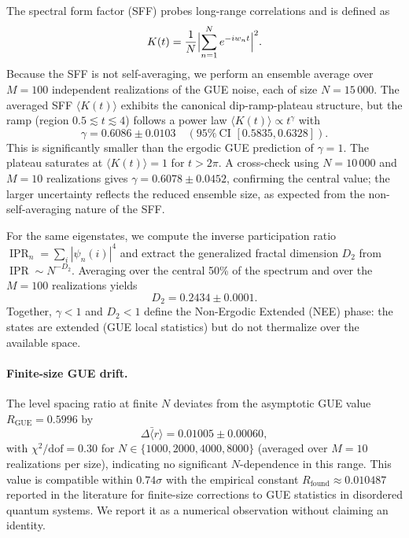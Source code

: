 \documentclass[11pt,a4paper]{article}
\DeclareMathOperator{\IPR}{IPR}
\begin{document}
The spectral form factor (SFF) probes long-range correlations and is defined as
\begin{equation}
K(t) = \frac{1}{N}\Bigl|\sum_{n=1}^N e^{-i w_n t}\Bigr|^2.
\end{equation}
Because the SFF is not self-averaging, we perform an ensemble average over $M=100$ independent realizations of the GUE noise, each of size $N=15\,000$. The averaged SFF $\langle K(t)\rangle$ exhibits the canonical dip-ramp-plateau structure, but the ramp (region $0.5 \lesssim t \lesssim 4$) follows a power law $\langle K(t)\rangle \propto t^\gamma$ with
\begin{equation}
\gamma = 0.6086 \pm 0.0103 \quad (95\%\ \text{CI } [0.5835,0.6328]).
\end{equation}
This is significantly smaller than the ergodic GUE prediction of $\gamma=1$. The plateau saturates at $\langle K(t)\rangle =1$ for $t>2\pi$. A cross-check using $N=10\,000$ and $M=10$ realizations gives $\gamma = 0.6078 \pm 0.0452$, confirming the central value; the larger uncertainty reflects the reduced ensemble size, as expected from the non-self-averaging nature of the SFF.

For the same eigenstates, we compute the inverse participation ratio $\IPR_n = \sum_i |\psi_n(i)|^4$ and extract the generalized fractal dimension $D_2$ from $\IPR \sim N^{-D_2}$. Averaging over the central 50\% of the spectrum and over the $M=100$ realizations yields
\begin{equation}
D_2 = 0.2434 \pm 0.0001.
\end{equation}
Together, $\gamma<1$ and $D_2<1$ define the Non-Ergodic Extended (NEE) phase: the states are extended (GUE local statistics) but do not thermalize over the available space.

\paragraph{Finite-size GUE drift.}
The level spacing ratio at finite $N$ deviates from the asymptotic GUE
value $R_{\text{GUE}} = 0.5996$ by
\begin{equation}
\bar{\Delta\langle r \rangle} = 0.01005 \pm 0.00060,
\end{equation}
with $\chi^2/\text{dof} = 0.30$ for $N \in \{1000, 2000, 4000, 8000\}$
(averaged over $M = 10$ realizations per size), indicating no significant
$N$-dependence in this range. This value is compatible within $0.74\sigma$
with the empirical constant $R_{\text{found}} \approx 0.010487$ reported
in the literature for finite-size corrections to GUE statistics in
disordered quantum systems. We report it as a numerical observation
without claiming an identity.
\end{document}
